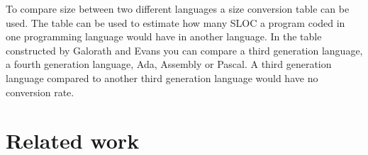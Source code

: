 To compare size between two different languages a size conversion table can be used. The table can be used to estimate how many SLOC a program coded in one programming language would have in another language. In the table constructed by Galorath and Evans you can compare a third generation language, a fourth generation language, Ada, Assembly or Pascal\cite[p.~163]{galorath2006}. A third generation language compared to another third generation language would have no conversion rate. 

\section{Related work}\label{section-related-work}

\iffalse
\subsection{Development goals} \label{subsection-development-goals}
Antoher goal is that the mobile application only provides data from native functions. In order to achieve that the web application and mobile application should have a master slave relationship. Where the web application acts as the master and the mobile application as the slave. To get data from the mobiles native functions the web application asks for the data and the mobile application passes the data back.

To enable this master and slave relationship the mobile and web application layer must be able to communicate. Passing commands and data between the layers. It is important the mobile and web application layers has a way of communicating that is developer friendly. 

It is important that the logic of the web application can be written in a general way (non-platform dependant) adapting to the device accessing the web application. So that the same web application code is used for the web application and mobile application.
\fi